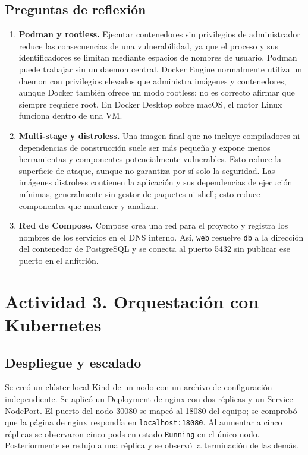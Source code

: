 \subsection{Preguntas de reflexión}
\begin{enumerate}
\item \textbf{Podman y rootless.} Ejecutar contenedores sin privilegios de administrador reduce las consecuencias de una vulnerabilidad, ya que el proceso y sus identificadores se limitan mediante espacios de nombres de usuario. Podman puede trabajar sin un daemon central. Docker Engine normalmente utiliza un daemon con privilegios elevados que administra imágenes y contenedores, aunque Docker también ofrece un modo rootless; no es correcto afirmar que siempre requiere root. En Docker Desktop sobre macOS, el motor Linux funciona dentro de una VM.
\item \textbf{Multi-stage y distroless.} Una imagen final que no incluye compiladores ni dependencias de construcción suele ser más pequeña y expone menos herramientas y componentes potencialmente vulnerables. Esto reduce la superficie de ataque, aunque no garantiza por sí solo la seguridad. Las imágenes distroless contienen la aplicación y sus dependencias de ejecución mínimas, generalmente sin gestor de paquetes ni shell; esto reduce componentes que mantener y analizar.
\item \textbf{Red de Compose.} Compose crea una red para el proyecto y registra los nombres de los servicios en el DNS interno. Así, \texttt{web} resuelve \texttt{db} a la dirección del contenedor de PostgreSQL y se conecta al puerto 5432 sin publicar ese puerto en el anfitrión.
\end{enumerate}

\section{Actividad 3. Orquestación con Kubernetes}

\subsection{Despliegue y escalado}
Se creó un clúster local Kind de un nodo con un archivo de configuración independiente. Se aplicó un Deployment de nginx con dos réplicas y un Service NodePort. El puerto del nodo 30080 se mapeó al 18080 del equipo; se comprobó que la página de nginx respondía en \texttt{localhost:18080}. Al aumentar a cinco réplicas se observaron cinco pods en estado \texttt{Running} en el único nodo. Posteriormente se redujo a una réplica y se observó la terminación de las demás.

